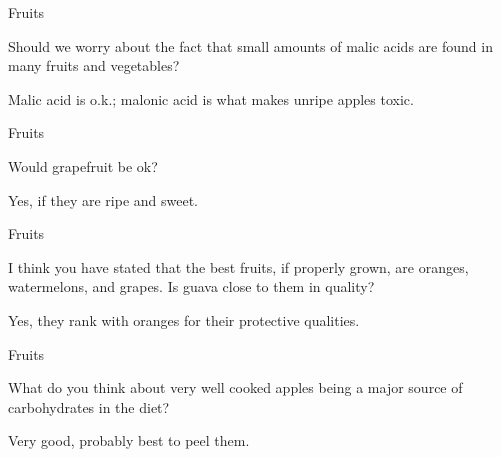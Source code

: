 \documentclass[11pt,oneside,openany,extrafontsizes]{memoir}
\begin{document}
\begin{qaexchange}{Fruits}

    \begin{question}
        Should we worry about the fact that small amounts of malic acids are found in many fruits and vegetables?
    \end{question}

    \begin{answer}
      Malic acid is o.k.; malonic acid is what makes unripe apples toxic.
    \end{answer}
\end{qaexchange}

\begin{qaexchange}{Fruits}

    \begin{question}
        Would grapefruit be ok?
    \end{question}

    \begin{answer}
      Yes, if they are ripe and sweet.
    \end{answer}
\end{qaexchange}

\begin{qaexchange}{Fruits}

    \begin{question}
        I think you have stated that the best fruits, if properly grown, are oranges, watermelons, and grapes. Is guava close to them in quality?
    \end{question}

    \begin{answer}
      Yes, they rank with oranges for their protective qualities.
    \end{answer}
\end{qaexchange}

\begin{qaexchange}{Fruits}

    \begin{question}
        What do you think about very well cooked apples being a major source of carbohydrates in the diet?
    \end{question}

    \begin{answer}
       Very good, probably best to peel them. 
    \end{answer}
\end{qaexchange}
\end{document}
